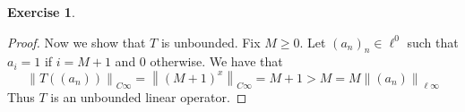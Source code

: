 \documentclass{article}
\theoremstyle{plain} %
\numberwithin{thm}{section} %
\theoremstyle{definition}
\newtheorem{exercise}[thm]{Exercise} %
\begin{document}
\begin{exercise}
\begin{enumerate}[label=(\alph*)]
\begin{proof}
                Now we show that \(T\) is unbounded. Fix \(M \geq 0\). Let \((a_n)_n \in \ell ^0\) such that \(a_i = 1\) if \(i=M+1\) and 0 otherwise. We have that
                \[
                    \left\lVert T((a_n)) \right\rVert _{C\infty} = \left\lVert (M+1)^x \right\rVert _{C\infty} = M+1 > M = M \left\lVert (a_n) \right\rVert _{\ell \infty}
                \]
                Thus \(T\) is an unbounded linear operator.

            \end{proof}
        \end{enumerate}
    \end{exercise}
\end{document}
